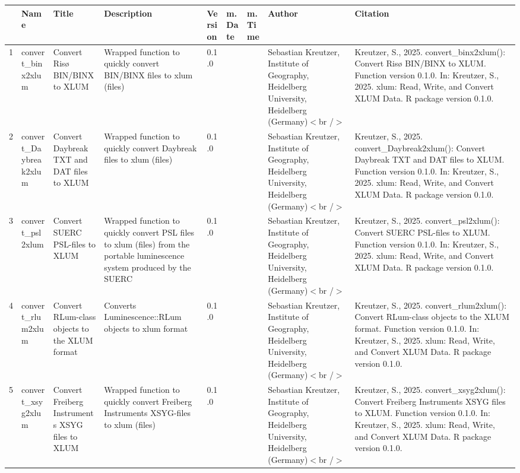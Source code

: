 \begin{table}[ht]
\centering
\begin{tabular}{rllllllll}
  \hline
 & Name & Title & Description & Version & m.Date & m.Time & Author & Citation \\ 
  \hline
1 & convert\_binx2xlum & Convert Risø BIN/BINX to XLUM & Wrapped function to quickly convert BIN/BINX files to  xlum  (files) & 0.1.0
 &  &  & Sebastian Kreutzer, Institute of Geography, Heidelberg University, Heidelberg (Germany)$<$br /$>$ & Kreutzer, S., 2025. convert\_binx2xlum(): Convert Risø BIN/BINX to XLUM. Function version 0.1.0. In: Kreutzer, S., 2025. xlum: Read, Write, and Convert XLUM Data. R package version 0.1.0. 
 \\ 
  2 & convert\_Daybreak2xlum & Convert Daybreak TXT and DAT files to XLUM & Wrapped function to quickly convert Daybreak files to  xlum  (files) & 0.1.0
 &  &  & Sebastian Kreutzer, Institute of Geography, Heidelberg University, Heidelberg (Germany)$<$br /$>$ & Kreutzer, S., 2025. convert\_Daybreak2xlum(): Convert Daybreak TXT and DAT files to XLUM. Function version 0.1.0. In: Kreutzer, S., 2025. xlum: Read, Write, and Convert XLUM Data. R package version 0.1.0. 
 \\ 
  3 & convert\_psl2xlum & Convert SUERC PSL-files to XLUM & Wrapped function to quickly convert PSL files to  xlum  (files) from the portable luminescence system produced by the SUERC & 0.1.0
 &  &  & Sebastian Kreutzer, Institute of Geography, Heidelberg University, Heidelberg (Germany)$<$br /$>$ & Kreutzer, S., 2025. convert\_psl2xlum(): Convert SUERC PSL-files to XLUM. Function version 0.1.0. In: Kreutzer, S., 2025. xlum: Read, Write, and Convert XLUM Data. R package version 0.1.0. 
 \\ 
  4 & convert\_rlum2xlum & Convert RLum-class objects to the XLUM format & Converts  Luminescence::RLum  objects to xlum format & 0.1.0
 &  &  & Sebastian Kreutzer, Institute of Geography, Heidelberg University, Heidelberg (Germany)$<$br /$>$ & Kreutzer, S., 2025. convert\_rlum2xlum(): Convert RLum-class objects to the XLUM format. Function version 0.1.0. In: Kreutzer, S., 2025. xlum: Read, Write, and Convert XLUM Data. R package version 0.1.0. 
 \\ 
  5 & convert\_xsyg2xlum & Convert Freiberg Instruments XSYG files to XLUM & Wrapped function to quickly convert Freiberg Instruments XSYG-files to  xlum  (files) & 0.1.0
 &  &  & Sebastian Kreutzer, Institute of Geography, Heidelberg University, Heidelberg (Germany)$<$br /$>$ & Kreutzer, S., 2025. convert\_xsyg2xlum(): Convert Freiberg Instruments XSYG files to XLUM. Function version 0.1.0. In: Kreutzer, S., 2025. xlum: Read, Write, and Convert XLUM Data. R package version 0.1.0. 

\end{tabular}
\end{table}

